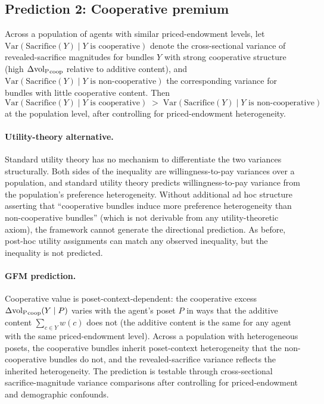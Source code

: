 \subsection{Prediction 2: Cooperative premium}
\label{sec:pred_coop_premium}

\begin{prediction}
\label{pred:coop_premium}
Across a population of agents with similar priced-endowment levels,
let $\mathrm{Var}(\mathrm{Sacrifice}(Y) \mid Y \text{ is cooperative})$
denote the cross-sectional variance of revealed-sacrifice magnitudes
for bundles $Y$ with strong cooperative structure (high
$\Delta{\operatorname{vol}_{\mathrm{P}}}_{\mathrm{coop}}$ relative to additive content), and
$\mathrm{Var}(\mathrm{Sacrifice}(Y) \mid Y \text{ is non-cooperative})$
the corresponding variance for bundles with little cooperative
content.  Then
\[
  \mathrm{Var}(\mathrm{Sacrifice}(Y) \mid Y \text{ is cooperative})
  \;>\;
  \mathrm{Var}(\mathrm{Sacrifice}(Y) \mid Y \text{ is non-cooperative})
\]
at the population level, after controlling for priced-endowment
heterogeneity.
\end{prediction}

\paragraph{Utility-theory alternative.}
Standard utility theory has no mechanism to differentiate the two
variances structurally.  Both sides of the inequality are
willingness-to-pay variances over a population, and standard utility
theory predicts willingness-to-pay variance from the population's
preference heterogeneity.  Without additional ad hoc structure
asserting that ``cooperative bundles induce more preference
heterogeneity than non-cooperative bundles'' (which is not
derivable from any utility-theoretic axiom), the framework
cannot generate
the directional prediction.  As before, post-hoc utility
assignments can match any observed inequality, but the inequality
is not predicted.

\paragraph{GFM prediction.}
Cooperative value is poset-context-dependent: the cooperative
excess $\Delta{\operatorname{vol}_{\mathrm{P}}}_{\mathrm{coop}}(Y \mid P)$ varies with the
agent's poset $P$ in ways that the additive content
$\sum_{c \in Y} w(c)$ does not (the additive content is the same
for any agent with the same priced-endowment level).  Across a
population with heterogeneous posets, the cooperative bundles
inherit poset-context heterogeneity that the non-cooperative
bundles do not, and the revealed-sacrifice variance reflects the
inherited heterogeneity.  The prediction is testable through
cross-sectional sacrifice-magnitude variance comparisons after
controlling for priced-endowment and demographic confounds.

